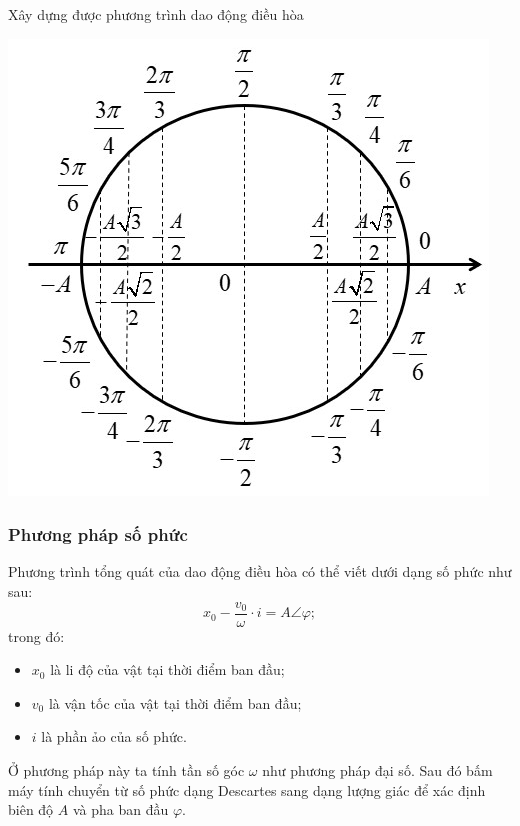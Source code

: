 \begin{dang}{Xây dựng được phương trình dao động điều hòa}
{{\begin{center}
				\includegraphics[scale=0.7]{../figs/VN12-PH-02-A-001-1-V2-4.jpg}
			\end{center}
		}
		
		\subsubsection{Phương pháp số phức}
		Phương trình tổng quát của dao động điều hòa có thể viết dưới dạng số phức như sau:
		\begin{equation*}
			x_0-\dfrac{v_0}{\omega}\cdot i=A\angle\varphi;
		\end{equation*}
		trong đó:
		\begin{itemize}
			\item $x_0$ là li độ của vật tại thời điểm ban đầu;
			\item $v_0$ là vận tốc của vật tại thời điểm ban đầu;
			\item $i$ là phần ảo của số phức.
		\end{itemize}
		
		Ở phương pháp này ta tính tần số góc $\omega$ như phương pháp đại số. Sau đó bấm máy tính chuyển từ số phức dạng Descartes sang dạng lượng giác để xác định biên độ $A$ và pha ban đầu $\varphi$.
		
}
\end{dang}

